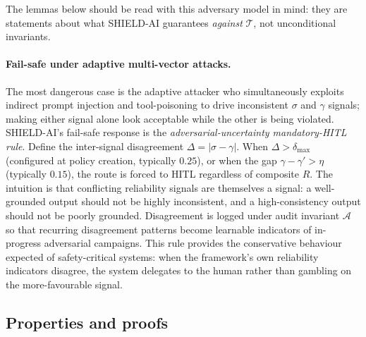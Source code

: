 \documentclass[preprint,12pt,authoryear]{elsarticle}
\begin{document}
The lemmas below should be read with this adversary model in mind: they are statements about what SHIELD-AI guarantees \emph{against} $\mathcal{T}$, not unconditional invariants.

\paragraph{Fail-safe under adaptive multi-vector attacks.}
The most dangerous case is the adaptive attacker who simultaneously exploits indirect prompt injection and tool-poisoning to drive inconsistent $\sigma$ and $\gamma$ signals; making either signal alone look acceptable while the other is being violated. SHIELD-AI's fail-safe response is the \emph{adversarial-uncertainty mandatory-HITL rule}. Define the inter-signal disagreement $\Delta = |\sigma - \gamma|$. When $\Delta > \delta_{\max}$ (configured at policy creation, typically $0.25$), or when the gap $\gamma - \gamma' > \eta$ (typically $0.15$), the route is forced to HITL regardless of composite $R$. The intuition is that conflicting reliability signals are themselves a signal: a well-grounded output should not be highly inconsistent, and a high-consistency output should not be poorly grounded. Disagreement is logged under audit invariant $\mathcal{A}$ so that recurring disagreement patterns become learnable indicators of in-progress adversarial campaigns. This rule provides the conservative behaviour expected of safety-critical systems: when the framework's own reliability indicators disagree, the system delegates to the human rather than gambling on the more-favourable signal.

\subsection{Properties and proofs}
\label{ssec:properties}
\end{document}
